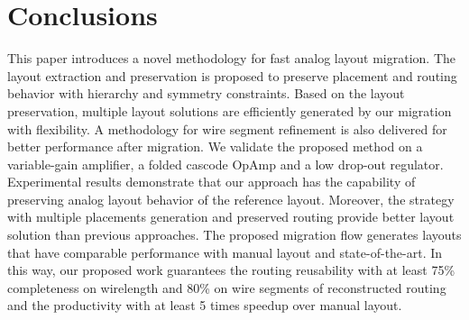 \chapter{Conclusions}\label{chap:Conclusion}

  This paper introduces a novel methodology for fast analog layout migration.
  The layout extraction and preservation is proposed to preserve placement and routing behavior with hierarchy and symmetry constraints.
  Based on the layout preservation, multiple layout solutions are efficiently generated by our migration with flexibility. A methodology for wire segment refinement is also delivered for better performance after migration.
  We validate the proposed method on a variable-gain amplifier, a folded cascode OpAmp and a low drop-out regulator.
  Experimental results demonstrate that our approach has the capability of preserving analog layout behavior of the reference layout. Moreover, the strategy with multiple placements generation and preserved routing provide better layout solution than previous approaches. The proposed migration flow generates layouts that have comparable performance with manual layout and state-of-the-art. In this way, our proposed work guarantees the routing reusability with at least 75\% completeness on wirelength and 80\% on wire segments of reconstructed routing and the productivity with at least 5 times speedup over manual layout.
